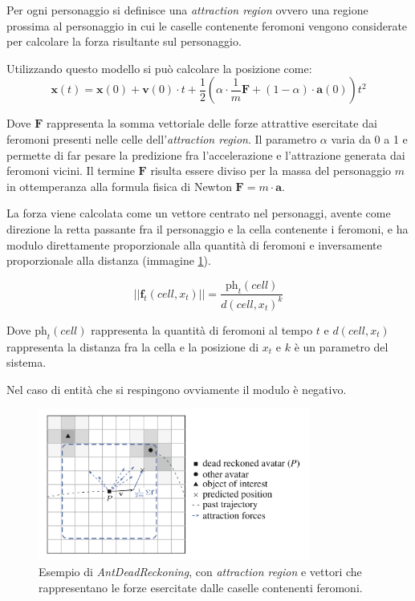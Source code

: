 \documentclass[a4paper,11pt]{article}
\begin{document}
Per ogni personaggio si definisce una \emph{attraction region} ovvero una regione prossima al personaggio in cui le caselle contenente feromoni vengono considerate per calcolare la forza risultante sul personaggio.

Utilizzando questo modello si pu\`o calcolare la posizione come:
$$ \bm{x}(t) = \bm{x}(0) + \bm{v}(0)\cdot t + \frac{1}{2} \left( \alpha \cdot \frac{1}{m} \bm{F} + (1 - \alpha) \cdot \bm{a}(0) \right) t^2 $$

Dove $\bm{F}$ rappresenta la somma vettoriale delle forze attrattive esercitate dai feromoni presenti nelle celle dell'\emph{attraction region}. Il parametro $\alpha$ varia da 0 a 1 e permette di far pesare la predizione fra l'accelerazione e l'attrazione generata dai feromoni vicini. Il termine $\bm{F}$ risulta essere diviso per la massa del personaggio $m$ in ottemperanza alla formula fisica di Newton $\bm{F} = m \cdot \bm{a}$.

La forza viene calcolata come un vettore centrato nel personaggi, avente come direzione la retta passante fra il personaggio e la cella contenente i feromoni, e ha modulo direttamente proporzionale alla quantit\`a di feromoni e inversamente proporzionale alla distanza (immagine \ref{img:ant}).

$$|| \bm{f}_t (cell, x_t) || = \frac{\textrm{ph}_t (cell)}{d(cell, x_t)^k} $$

Dove $\textrm{ph}_t (cell)$ rappresenta la quantit\`a di feromoni al tempo $t$ e $d(cell, x_t)$ rappresenta la distanza fra la cella e la posizione di $x_t$ e $k$ \`e un parametro del sistema.

Nel caso di entit\`a che si respingono ovviamente il modulo \`e negativo.

\begin{figure}[ht]
\centering
\includegraphics[height=5cm]{d2.png}
\caption{\small{Esempio di \emph{AntDeadReckoning}, con \emph{attraction region} e vettori che rappresentano le forze esercitate dalle caselle contenenti feromoni.}}
\label{img:ant}
\end{figure}
\end{document}
